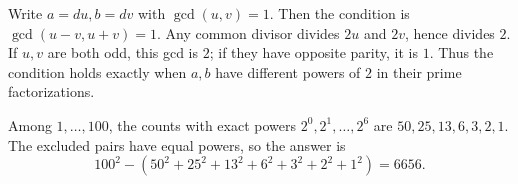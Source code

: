 Write $a=du,b=dv$ with $\gcd(u,v)=1$. Then the condition is $\gcd(u-v,u+v)=1$. Any common divisor divides $2u$ and $2v$, hence divides $2$. If $u,v$ are both odd, this gcd is $2$; if they have opposite parity, it is $1$. Thus the condition holds exactly when $a,b$ have different powers of $2$ in their prime factorizations.

Among $1,\ldots,100$, the counts with exact powers $2^0,2^1,\ldots,2^6$ are $50,25,13,6,3,2,1$. The excluded pairs have equal powers, so the answer is
\[
\boxed{100^2-(50^2+25^2+13^2+6^2+3^2+2^2+1^2)=6656}.
\]
